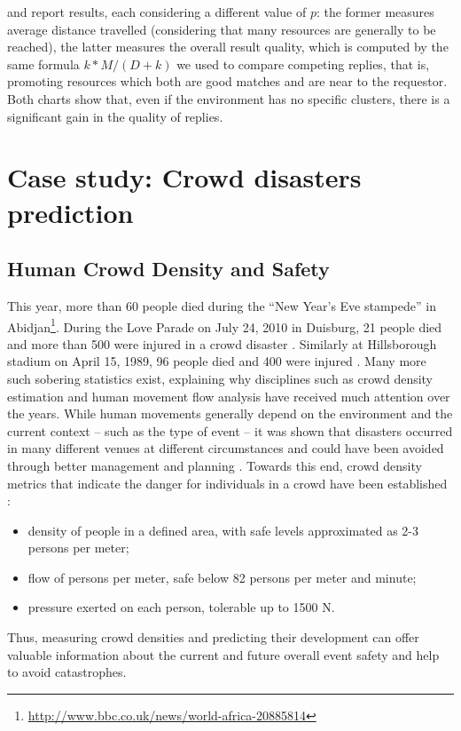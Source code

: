 \documentclass[12pt,a4paper,twoside,openright]{book}
\begin{document}
 and  report results, each considering a different value of $p$: the former measures average distance travelled (considering that many resources are generally to be reached), the latter measures the overall result quality, which is computed by the same formula $k*M/(D+k)$ we used to compare competing replies, that is, promoting resources which both are good matches and are near to the requestor.
%
Both charts show that, even if the environment has no specific clusters, there is a significant gain in the quality of replies.

\chapter{Case study: Crowd disasters prediction}

\section{Human Crowd Density and Safety}
\label{sec:human-density-safety}

This year, more than 60 people died during the ``New Year's Eve stampede'' in Abidjan\footnote{\url{http://www.bbc.co.uk/news/world-africa-20885814}}.
%
During the Love Parade on July 24, 2010 in Duisburg, 21 people died and more than 500 were injured in a crowd disaster \cite{helbing2012}.
%
Similarly at Hillsborough stadium on April 15, 1989, 96 people died and 400 were injured \cite{Nicholson1995}.
%
Many more such sobering statistics exist, explaining why disciplines such as crowd density estimation and human movement flow analysis have received much attention over the years.
%
While human movements generally depend on the environment and the current context -- such as the type of event -- it was shown that disasters occurred in many different venues at different circumstances and could have been avoided through better management and planning \cite{fruin1993}.
%
Towards this end, crowd density metrics that indicate the danger for individuals in a crowd have been established \cite{helbing2012,fruin1993}:
\begin{itemize}
 \item density of people in a defined area, with safe levels approximated as 2-3 persons per meter;
 \item flow of persons per meter, safe below 82 persons per meter and minute;
 \item pressure exerted on each person, tolerable up to 1500 N.
\end{itemize}
%
Thus, measuring crowd densities and predicting their development can offer valuable information about the current and future overall event safety and help to avoid catastrophes.
\end{document}
